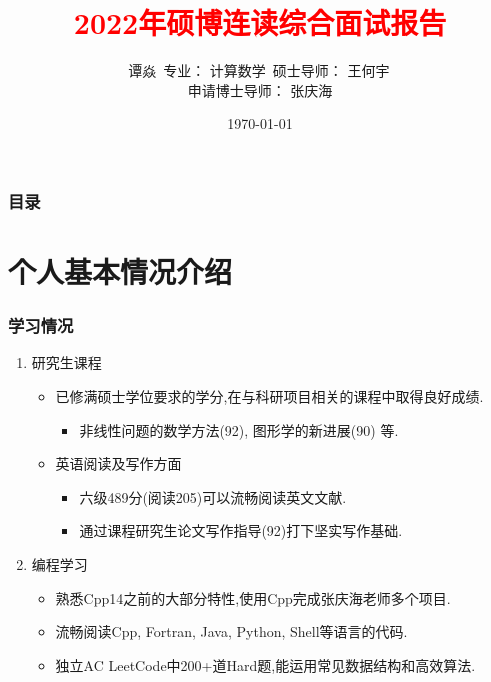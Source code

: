 \documentclass[UTF8]{ctexbeamer}	%
\title{\textcolor{red}{2022年硕博连读综合面试报告}}
\author{谭焱\, \newline   \newline \small{专业： 计算数学}\, 
\newline \newline
 \small{硕士导师： 王何宇\, \\
 申请博士导师： 张庆海}}
\institute{浙江大学数学科学学院}
\date{\today}
\theoremstyle{plain}
\theoremstyle{definition}
\newtheorem{emt}{}[section]
\theoremstyle{remark}
\numberwithin{equation}{section}
\begin{document}

\begin{frame}
\titlepage
\end{frame}


\begin{frame}
    \frametitle{目录}
    \tableofcontents
  \end{frame}

\section{个人基本情况介绍}


        


\begin{frame}[fragile]
    \frametitle{学习情况}
\begin{enumerate}
    \item 研究生课程
    \begin{itemize}
        \item 已修满硕士学位要求的学分,在与科研项目相关的课程中取得良好成绩.
        \begin{itemize}
            \item 非线性问题的数学方法(92), 图形学的新进展(90) 等.
        \end{itemize}
        \item 英语阅读及写作方面
        \begin{itemize}
            \item 六级489分(阅读205)可以流畅阅读英文文献.
            \item 通过课程研究生论文写作指导(92)打下坚实写作基础.
        \end{itemize}
    \end{itemize}
    \item 编程学习
    \begin{itemize}
        \item 熟悉Cpp14之前的大部分特性,使用Cpp完成张庆海老师多个项目.
        \item 流畅阅读Cpp, Fortran, Java, Python, Shell等语言的代码.
        \item 独立AC LeetCode中200+道Hard题,能运用常见数据结构和高效算法.
    \end{itemize}
\end{enumerate}
\end{frame}
\end{document}
